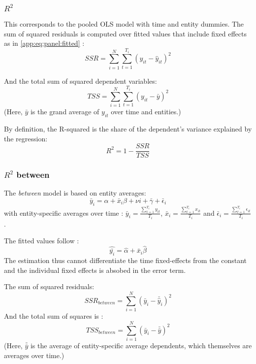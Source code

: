 \subsubsection{$R^2$}
This corresponds to the pooled OLS model with time and entity dummies. The sum of squared residuals is computed over fitted values that include fixed effects as in \eqref{app:eq:panel:fitted} :
\begin{equation}
  SSR = \sum_{i = 1}^N \sum_{t = 1}^{T_{i}} (y_{it} - \hat{y}_{it})^2
\end{equation}

And the total sum of squared dependent variables:
\begin{equation}
  TSS = \sum_{i = 1}^N \sum_{t = 1}^{T_{i}} (y_{it} - \bar{y})^2
\end{equation}
(Here, $\bar{y}$ is the grand average of $y_{it}$ over time and entities.)

By definition, the R-squared is the share of the dependent's variance explained by the regression:
\begin{equation}
R^{2} = 1 - \frac{SSR}{TSS}
\end{equation}

\subsubsection{$R^2$ between}
The \textit{between} model is based on entity averages:
\begin{equation}
\bar{y}_{i} = \alpha + \bar{x}_{i} \beta + \nu{i} + \bar{\gamma} + \bar{\epsilon}_{i}  
\end{equation}
with entity-specific averages over time : $\bar{y}_{i} = \frac{\sum_{t=1}^{T_{i}} y_{it}}{T_{i}}$, $\bar{x}_{i} = \frac{\sum_{t=1}^{T_{i}} x_{it}}{T_{i}}$ and  $\bar{\epsilon}_{i} = \frac{\sum_{t=1}^{T_{i}} \epsilon_{it}}{T_{i}}$.

The fitted values follow :
\begin{equation}
  \hat{\bar{y_{i}}} = \hat{\alpha} + \bar{x}_{i}\hat{\beta}
\end{equation}
The estimation thus cannot differentiate the time fixed-effects from the constant and the individual fixed effects is absobed in the error term.

The sum of squared residuals:
\begin{equation}
  SSR_{between} = \sum_{i = 1}^{N} (\bar{y}_{i} - \bar{\hat{y}}_{i})^2
\end{equation}
And the total sum of squares is :
\begin{equation}
  TSS_{between} = \sum_{i = 1}^{N} (\bar{y}_{i} - \bar{\bar{y}})^2 
\end{equation}
(Here, $\bar{\bar{y}}$ is the average of entity-specific average dependents, which themselves are averages over time.)

